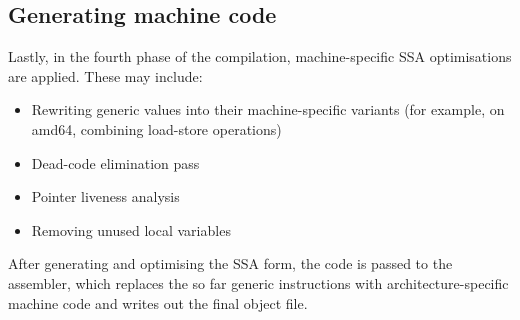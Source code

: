 \subsection{Generating machine code}

Lastly, in the fourth phase of the compilation, machine-specific
SSA optimisations are applied. These may include:
\begin{itemize}
    \item Rewriting generic values into their machine-specific variants
        (for example, on amd64, combining load-store operations)
    \item Dead-code elimination pass
    \item Pointer liveness analysis
    \item Removing unused local variables
\end{itemize}

After generating and optimising the SSA form, the code is passed to the
assembler, which replaces the so far generic instructions with
architecture-specific machine code and writes out the final object file\autocite{compiler-readme}.
